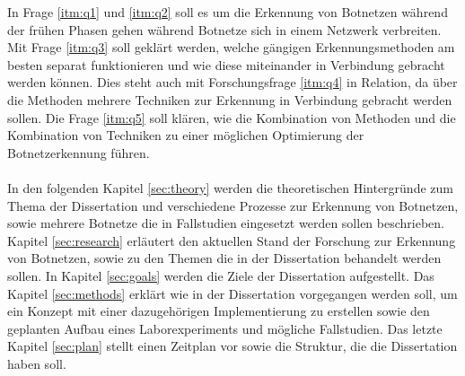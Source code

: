 In Frage \ref{itm:q1} und \ref{itm:q2} soll es um die Erkennung von Botnetzen während der frühen Phasen gehen während Botnetze sich in einem Netzwerk verbreiten. Mit Frage
\ref{itm:q3} soll geklärt werden, welche gängigen Erkennungsmethoden am besten separat funktionieren und wie diese miteinander in Verbindung gebracht werden können. Dies 
steht auch mit Forschungsfrage \ref{itm:q4} in Relation, da über die Methoden mehrere Techniken zur Erkennung in Verbindung gebracht werden sollen. Die Frage \ref{itm:q5} 
soll klären, wie die Kombination von Methoden und die Kombination von Techniken zu einer möglichen Optimierung der Botnetzerkennung führen.
\\ \\ 
In den folgenden Kapitel \ref{sec:theory} werden die theoretischen Hintergründe zum Thema der Dissertation und verschiedene Prozesse zur Erkennung von Botnetzen, sowie 
mehrere Botnetze die in Fallstudien eingesetzt werden sollen beschrieben. Kapitel \ref{sec:research} erläutert den aktuellen Stand der Forschung zur Erkennung von Botnetzen,
sowie zu den Themen die in der Dissertation behandelt werden sollen. In Kapitel \ref{sec:goals} werden die Ziele der Dissertation aufgestellt. Das Kapitel \ref{sec:methods}
erklärt wie in der Dissertation vorgegangen werden soll, um ein Konzept mit einer dazugehörigen Implementierung zu erstellen sowie den geplanten Aufbau eines Laborexperiments
und mögliche Fallstudien. Das letzte Kapitel \ref{sec:plan} stellt einen Zeitplan vor sowie die Struktur, die die Dissertation haben soll.